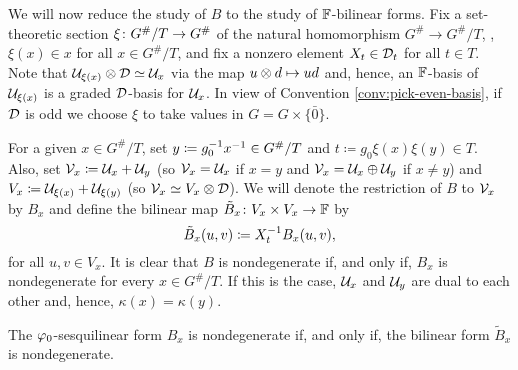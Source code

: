 
We will now reduce the study of $B$ to the study of $\mathbb{F}$-bilinear forms.
Fix a set-theoretic section $\xi\colon G^\#/T \to G^\#$ of the natural homomorphism $ G^\# \to G^\#/T$, \ie, $\xi (x) \in x$ for all $x \in G^\#/T$, and fix a nonzero element $X_t \in \mathcal{D}_t$ for all $t\in T$.
Note that $\mathcal U_{\xi(x)} \otimes \mathcal{D} \simeq \mathcal U_x$ via the map $u \otimes d \mapsto ud$ and, hence, an $\mathbb{F}$-basis of $\mathcal U_{\xi(x)}$ is a graded $\mathcal{D}$-basis for $\mathcal U_x$.
In view of Convention \ref{conv:pick-even-basis}, if $\mathcal{D}$ is odd we choose $\xi$ to take values in $G = G\times \{ \bar 0 \}$.

For a given $x \in G^\#/T$, set $y \coloneqq g_0^{-1} x^{-1} \in G^\#/T$ and $t \coloneqq g_0 \xi(x) \xi(y) \in T$.
Also, set $\mathcal V_x \coloneqq \mathcal U_x + \mathcal U_y$ (so $\mathcal V_x = \mathcal U_x$ if $x=y$ and $\mathcal V_x = \mathcal U_x \oplus \mathcal U_y$ if $x \neq y$) and $V_x \coloneqq \mathcal U_{\xi(x)} + \mathcal U_{\xi(y)}$ (so $\mathcal V_x \simeq V_x \otimes \mathcal{D}$).
We will denote the restriction of $B$ to $\mathcal V_x$ by $B_x$ and define the bilinear map $\tilde{B}_x\colon V_x \times V_x \to \mathbb{F}$ by
\begin{equation}\label{eq:B_x-tilde}
	\tilde{B}_x (u,v) \coloneqq X_{t}^{-1} B_x (u,v),
\end{equation}
for all $u,v \in V_x$.
It is clear that $B$ is nondegenerate if, and only if, $B_x$ is nondegenerate for every $x \in G^\#/T$.
If this is the case, $\mathcal U_x$ and $\mathcal U_y$ are dual to each other and, hence, $\kappa(x) = \kappa(y)$.

\begin{lemma}\label{lemma:B_x-nondeg}
	The $\varphi_0$-sesquilinear form $B_x$ is nondegenerate if, and only if, the bilinear form $\tilde{B}_x$ is nondegenerate.
\end{lemma}

